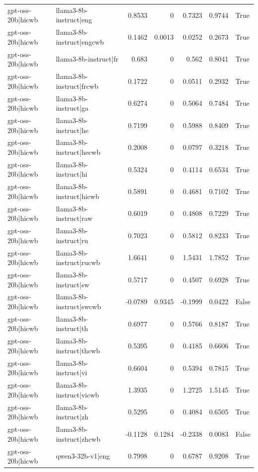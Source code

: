 \begin{table}
\begin{tabular}{l l r r r r l}
gpt-oss-20b|hicwb & llama3-8b-instruct|eng & 0.8533 & 0 & 0.7323 & 0.9744 & True \\
gpt-oss-20b|hicwb & llama3-8b-instruct|engcwb & 0.1462 & 0.0013 & 0.0252 & 0.2673 & True \\
gpt-oss-20b|hicwb & llama3-8b-instruct|fr & 0.683 & 0 & 0.562 & 0.8041 & True \\
gpt-oss-20b|hicwb & llama3-8b-instruct|frcwb & 0.1722 & 0 & 0.0511 & 0.2932 & True \\
gpt-oss-20b|hicwb & llama3-8b-instruct|ga & 0.6274 & 0 & 0.5064 & 0.7484 & True \\
gpt-oss-20b|hicwb & llama3-8b-instruct|he & 0.7199 & 0 & 0.5988 & 0.8409 & True \\
gpt-oss-20b|hicwb & llama3-8b-instruct|hecwb & 0.2008 & 0 & 0.0797 & 0.3218 & True \\
gpt-oss-20b|hicwb & llama3-8b-instruct|hi & 0.5324 & 0 & 0.4114 & 0.6534 & True \\
gpt-oss-20b|hicwb & llama3-8b-instruct|hicwb & 0.5891 & 0 & 0.4681 & 0.7102 & True \\
gpt-oss-20b|hicwb & llama3-8b-instruct|raw & 0.6019 & 0 & 0.4808 & 0.7229 & True \\
gpt-oss-20b|hicwb & llama3-8b-instruct|ru & 0.7023 & 0 & 0.5812 & 0.8233 & True \\
gpt-oss-20b|hicwb & llama3-8b-instruct|rucwb & 1.6641 & 0 & 1.5431 & 1.7852 & True \\
gpt-oss-20b|hicwb & llama3-8b-instruct|sw & 0.5717 & 0 & 0.4507 & 0.6928 & True \\
gpt-oss-20b|hicwb & llama3-8b-instruct|swcwb & -0.0789 & 0.9345 & -0.1999 & 0.0422 & False \\
gpt-oss-20b|hicwb & llama3-8b-instruct|th & 0.6977 & 0 & 0.5766 & 0.8187 & True \\
gpt-oss-20b|hicwb & llama3-8b-instruct|thcwb & 0.5395 & 0 & 0.4185 & 0.6606 & True \\
gpt-oss-20b|hicwb & llama3-8b-instruct|vi & 0.6604 & 0 & 0.5394 & 0.7815 & True \\
gpt-oss-20b|hicwb & llama3-8b-instruct|vicwb & 1.3935 & 0 & 1.2725 & 1.5145 & True \\
gpt-oss-20b|hicwb & llama3-8b-instruct|zh & 0.5295 & 0 & 0.4084 & 0.6505 & True \\
gpt-oss-20b|hicwb & llama3-8b-instruct|zhcwb & -0.1128 & 0.1284 & -0.2338 & 0.0083 & False \\
gpt-oss-20b|hicwb & qwen3-32b-v1|eng & 0.7998 & 0 & 0.6787 & 0.9208 & True \\

\end{tabular}
\end{table}
